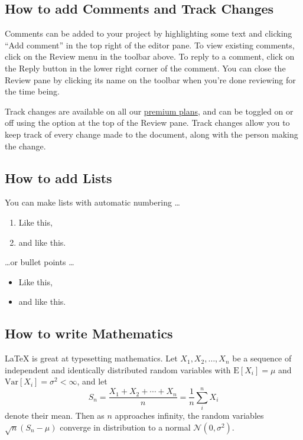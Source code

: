 \documentclass{article}
\begin{document}
\subsection{How to add Comments and Track Changes}

Comments can be added to your project by highlighting some text and clicking ``Add comment'' in the top right of the editor pane. To view existing comments, click on the Review menu in the toolbar above. To reply to a comment, click on the Reply button in the lower right corner of the comment. You can close the Review pane by clicking its name on the toolbar when you're done reviewing for the time being.

Track changes are available on all our \href{https://www.overleaf.com/user/subscription/plans}{premium plans}, and can be toggled on or off using the option at the top of the Review pane. Track changes allow you to keep track of every change made to the document, along with the person making the change. 

\subsection{How to add Lists}

You can make lists with automatic numbering \dots

\begin{enumerate}
\item Like this,
\item and like this.
\end{enumerate}
\dots or bullet points \dots
\begin{itemize}
\item Like this,
\item and like this.
\end{itemize}

\subsection{How to write Mathematics}

\LaTeX{} is great at typesetting mathematics. Let $X_1, X_2, \ldots, X_n$ be a sequence of independent and identically distributed random variables with $\text{E}[X_i] = \mu$ and $\text{Var}[X_i] = \sigma^2 < \infty$, and let
\[S_n = \frac{X_1 + X_2 + \cdots + X_n}{n}
      = \frac{1}{n}\sum_{i}^{n} X_i\]
denote their mean. Then as $n$ approaches infinity, the random variables $\sqrt{n}(S_n - \mu)$ converge in distribution to a normal $\mathcal{N}(0, \sigma^2)$.
\end{document}
